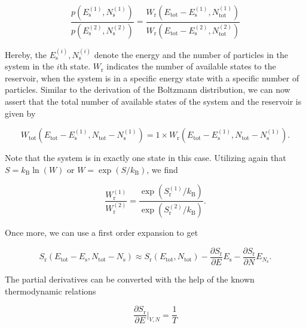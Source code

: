 \documentclass[letterpaper,10pt,english]{sphinxmanual}
\begin{document}
\sphinxAtStartPar
\begin{equation}
\frac{p(E_\mathrm{s}^{(1)},N_\mathrm{s}^{(1)})}{p(E_\mathrm{s}^{(2)},N_\mathrm{s}^{(2)})}=\frac{W_\mathrm{r}(E_\mathrm{tot}-E_\mathrm{s}^{(1)},N_\mathrm{tot}^{(1)})}{W_\mathrm{r}(E_\mathrm{tot}-E_\mathrm{s}^{(2)},N_\mathrm{tot}^{(2)})}
\end{equation}

\sphinxAtStartPar
Hereby, the \(E_\mathrm{s}^{(i)}, N_\mathrm{s}^{(i)}\) denote the energy and the number of particles in the system in the \(i\)th state. \(W_\mathrm{r}\) indicates the number of available states to the reservoir, when the system is in a specific energy state with a specific number of particles. Similar to the derivation of the Boltzmann distribution, we can now assert that the total number of available states of the system and the reservoir is given by

\sphinxAtStartPar
\begin{equation}
W_\mathrm{tot}(E_\mathrm{tot}-E_\mathrm{s}^{(1)},N_\mathrm{tot}-N_\mathrm{s}^{(1)})=1\times W_\mathrm{r}(E_\mathrm{tot}-E_\mathrm{s}^{(1)},N_\mathrm{tot}-N_\mathrm{s}^{(1)}).
\end{equation}

\sphinxAtStartPar
Note that the system is in exactly one state in this case. Utilizing again that \(S=k_\mathrm{B} \ln(W)\) or \(W=\exp(S/k_\mathrm{B})\), we find

\sphinxAtStartPar
\begin{equation}
\frac{W_\mathrm{r}^{(1)}}{W_\mathrm{r}^{(2)}}=\frac{\exp(S_\mathrm{r}^{(1)}/k_\mathrm{B})}{\exp(S_\mathrm{r}^{(2)}/k_\mathrm{B})}.
\end{equation}

\sphinxAtStartPar
Once more, we can use a first order expansion to get

\sphinxAtStartPar
\begin{equation}
S_\mathrm{r}(E_\mathrm{tot}-E_\mathrm{s},N_\mathrm{tot}-N_\mathrm{s})\approx S_\mathrm{r}(E_\mathrm{tot},N_\mathrm{tot})-\frac{\partial S_\mathrm{r}}{\partial E}E_\mathrm{s}-\frac{\partial S_\mathrm{r}}{\partial N}E_{N_\mathrm{s}}.
\end{equation}

\sphinxAtStartPar
The partial derivatives can be converted with the help of the known thermodynamic relations

\sphinxAtStartPar
\begin{equation}
\frac{\partial S_\mathrm{r}}{\partial E}\bigg|_{V,N} =\frac{1}{T}
\end{equation}
\end{document}

